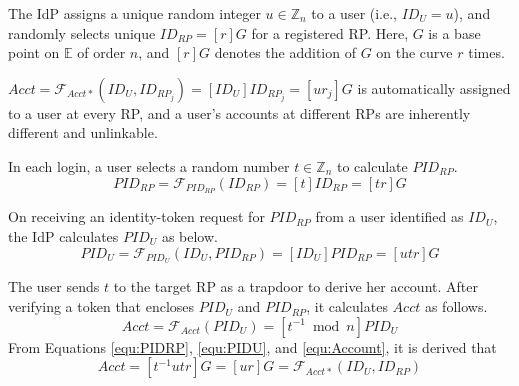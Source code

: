 The IdP assigns a unique random integer $u \in \mathbb{Z}_n$ to a user (i.e., $ID_U = u$),
 and randomly selects unique $ID_{RP} = [r]G$ for a registered RP. %
Here, $G$ is a base point on $\mathbb{E}$ of order $n$, and $[r]G$ denotes the addition of $G$ on the curve $r$ times.

$Acct = \mathcal{F}_{Acct\ast}(ID_U, ID_{RP_j})= [ID_U]ID_{RP_j} =[ur_j]G$ is automatically assigned 
        to a user at every RP,
and a user's accounts at different RPs are inherently different and unlinkable.

 In each login, a user selects a random number $t \in \mathbb{Z}_n$ to calculate $PID_{RP}$.
\begin{equation}
PID_{RP} = \mathcal{F}_{PID_{RP}}(ID_{RP}) = [t]{ID_{RP}} = [tr]G
\label{equ:PIDRP}
\end{equation}



On receiving an identity-token request for $PID_{RP}$ from a user identified as $ID_U$, the IdP calculates $PID_{U}$ as below.
\begin{equation}
PID_{U} = \mathcal{F}_{PID_U}(ID_U, PID_{RP}) =
  [{ID_U}]{PID_{RP}} = [utr]G
 \label{equ:PIDU}
\end{equation}


The user sends $t$ to the target RP as a trapdoor to derive her account.
After verifying a token that encloses $PID_U$ and $PID_{RP}$, it calculates $Acct$ as follows.
\begin{equation}
Acct = \mathcal{F}_{Acct}(PID_{U})
   = [t^{-1} \bmod n]PID_{U}
   \label{equ:Account}
\end{equation}
From Equations \ref{equ:PIDRP}, \ref{equ:PIDU}, and \ref{equ:Account}, it is derived that
\begin{equation}
   Acct =  [t^{-1}utr]G = [ur]G = \mathcal{F}_{Acct\ast}(ID_U, ID_{RP})
   \label{equ:AccountNotChanged}
\end{equation}


